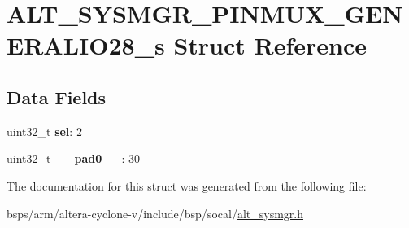 \hypertarget{structALT__SYSMGR__PINMUX__GENERALIO28__s}{}\section{A\+L\+T\+\_\+\+S\+Y\+S\+M\+G\+R\+\_\+\+P\+I\+N\+M\+U\+X\+\_\+\+G\+E\+N\+E\+R\+A\+L\+I\+O28\+\_\+s Struct Reference}
\label{structALT__SYSMGR__PINMUX__GENERALIO28__s}
\subsection*{Data Fields}
\begin{DoxyCompactItemize}
\item 
\mbox{\label{structALT__SYSMGR__PINMUX__GENERALIO28__s_a8593c25d4b1147adc4bd525943b1333a}} 
uint32\+\_\+t {\bfseries sel}\+: 2
\item 
\mbox{\label{structALT__SYSMGR__PINMUX__GENERALIO28__s_a8a2c354829b01105ce9b38e8d4e352eb}} 
uint32\+\_\+t {\bfseries \+\_\+\+\_\+pad0\+\_\+\+\_\+}\+: 30
\end{DoxyCompactItemize}


The documentation for this struct was generated from the following file\+:\begin{DoxyCompactItemize}
\item 
bsps/arm/altera-\/cyclone-\/v/include/bsp/socal/\mbox{\hyperlink{alt__sysmgr_8h}{alt\+\_\+sysmgr.\+h}}\end{DoxyCompactItemize}
